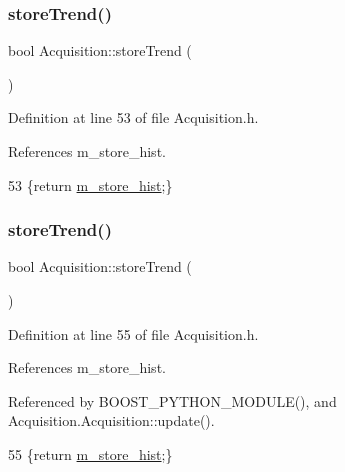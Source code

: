 \subsubsection{\texorpdfstring{store\+Trend()}{storeTrend()}\hspace{0.1cm}{\footnotesize\ttfamily [1/2]}}
{\footnotesize\ttfamily bool Acquisition\+::store\+Trend (\begin{DoxyParamCaption}{ }\end{DoxyParamCaption})\hspace{0.3cm}{\ttfamily [inline]}}



Definition at line 53 of file Acquisition.\+h.



References m\+\_\+store\+\_\+hist.


\begin{DoxyCode}
53 \{\textcolor{keywordflow}{return} \hyperlink{classAcquisition_a08f70edd83751dbdab4c8190dc4b9188}{m\_store\_hist};\}
\end{DoxyCode}
\mbox{\label{classAcquisition_a5af693448daef6e9e054ab7f1aa50784}} 
\subsubsection{\texorpdfstring{store\+Trend()}{storeTrend()}\hspace{0.1cm}{\footnotesize\ttfamily [2/2]}}
{\footnotesize\ttfamily bool Acquisition\+::store\+Trend (\begin{DoxyParamCaption}{ }\end{DoxyParamCaption})\hspace{0.3cm}{\ttfamily [inline]}}



Definition at line 55 of file Acquisition.\+h.



References m\+\_\+store\+\_\+hist.



Referenced by B\+O\+O\+S\+T\+\_\+\+P\+Y\+T\+H\+O\+N\+\_\+\+M\+O\+D\+U\+L\+E(), and Acquisition.\+Acquisition\+::update().


\begin{DoxyCode}
55 \{\textcolor{keywordflow}{return} \hyperlink{classAcquisition_a08f70edd83751dbdab4c8190dc4b9188}{m\_store\_hist};\}
\end{DoxyCode}
\mbox{\label{classAcquisition_a6f680938eb6a42d57dfa7466e8852af9}} 

